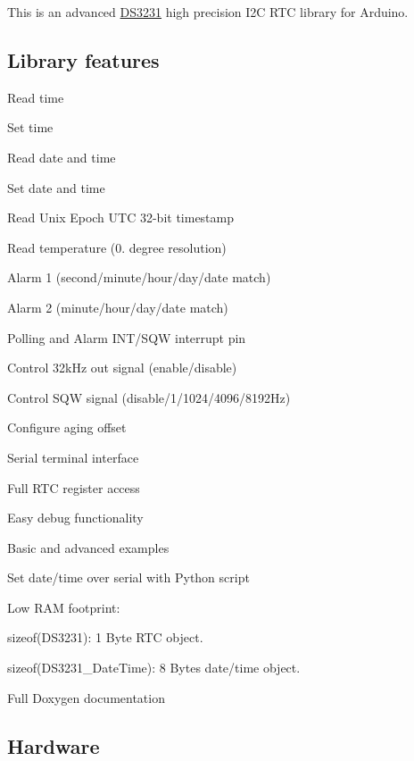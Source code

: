 \href{https://travis-ci.org/Erriez/ErriezDS3231}{\tt }

This is an advanced \hyperlink{class_d_s3231}{D\+S3231} high precision I2C R\+TC library for Arduino.



\subsection*{Library features}


\begin{DoxyItemize}
\item Read time
\item Set time
\item Read date and time
\item Set date and time
\item Read Unix Epoch U\+TC 32-\/bit timestamp
\item Read temperature (0. degree resolution)
\item Alarm 1 (second/minute/hour/day/date match)
\item Alarm 2 (minute/hour/day/date match)
\item Polling and Alarm {\ttfamily I\+N\+T/\+S\+QW} interrupt pin
\item Control {\ttfamily 32k\+Hz} out signal (enable/disable)
\item Control {\ttfamily S\+QW} signal (disable/1/1024/4096/8192\+Hz)
\item Configure aging offset
\item Serial terminal interface
\item Full R\+TC register access
\item Easy debug functionality
\item Basic and advanced examples
\item Set date/time over serial with Python script
\item Low R\+AM footprint\+:
\begin{DoxyItemize}
\item {\ttfamily sizeof(\+D\+S3231)}\+: 1 Byte R\+TC object.
\item {\ttfamily sizeof(\+D\+S3231\+\_\+\+Date\+Time)}\+: 8 Bytes date/time object.
\end{DoxyItemize}
\item Full Doxygen documentation
\end{DoxyItemize}

\subsection*{Hardware}


